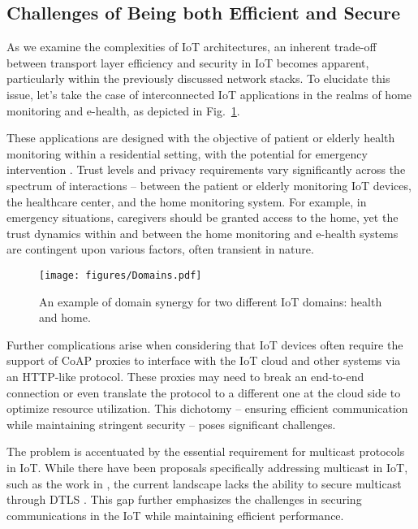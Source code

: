 \documentclass{ieeeaccess}
\begin{document}
\subsection{Challenges of Being both Efficient and Secure}

As we examine the complexities of IoT architectures, an inherent trade-off between transport layer efficiency and security in IoT becomes apparent, particularly within the previously discussed network stacks. To elucidate this issue, let's take the case of interconnected IoT applications in the realms of home monitoring and e-health, as depicted in Fig.~\ref{fig:domains}.

These applications are designed with the objective of patient or elderly health monitoring within a residential setting, with the potential for emergency intervention \cite{liu2016smart}. Trust levels and privacy requirements vary significantly across the spectrum of interactions -- between the patient or elderly monitoring IoT devices, the healthcare center, and the home monitoring system. For example, in emergency situations, caregivers should be granted access to the home, yet the trust dynamics within and between the home monitoring and e-health systems are contingent upon various factors, often transient in nature.


\begin{figure}
	\centering
	\texttt{[image: figures/Domains.pdf]}
	\caption{An example of domain synergy for two different IoT domains: health and home.}
	\label{fig:domains}
\end{figure}

Further complications arise when considering that IoT devices often require the support of CoAP proxies to interface with the IoT cloud and other systems via an HTTP-like protocol. These proxies may need to break an end-to-end connection or even translate the protocol to a different one at the cloud side to optimize resource utilization. This dichotomy -- ensuring efficient communication while maintaining stringent security -- poses significant challenges.

The problem is accentuated by the essential requirement for multicast protocols in IoT. While there have been proposals specifically addressing multicast in IoT, such as the work in \cite{huang2016multicast}, the current landscape lacks the ability to secure multicast through DTLS \cite{grammatikis2019securing}. This gap further emphasizes the challenges in securing communications in the IoT while maintaining efficient performance.
\end{document}
